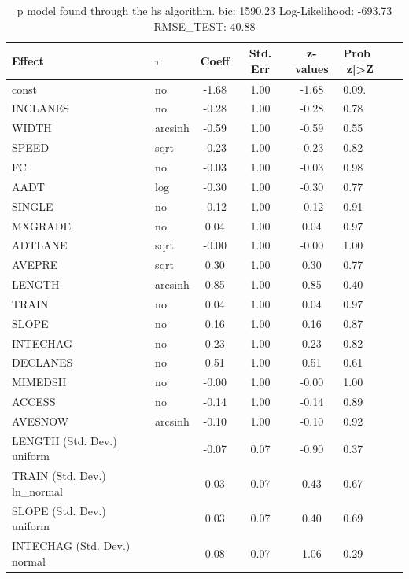 \begin{table}
	\caption{p model found through the hs algorithm. bic: 1590.23 Log-Likelihood: -693.73 RMSE_TEST: 40.88}
	\begin{center}
		\begin{tabular}{|l|l|c|c|c|l|}
			\hline
			Effect & $\tau$ & Coeff & Std. Err & z-values & Prob |z|>Z \\
			\hline
			const & no & -1.68 & 1.00 & -1.68 & 0.09. \\
			\hline
			INCLANES & no & -0.28 & 1.00 & -0.28 & 0.78 \\
			\hline
			WIDTH & arcsinh & -0.59 & 1.00 & -0.59 & 0.55 \\
			\hline
			SPEED & sqrt & -0.23 & 1.00 & -0.23 & 0.82 \\
			\hline
			FC & no & -0.03 & 1.00 & -0.03 & 0.98 \\
			\hline
			AADT & log & -0.30 & 1.00 & -0.30 & 0.77 \\
			\hline
			SINGLE & no & -0.12 & 1.00 & -0.12 & 0.91 \\
			\hline
			MXGRADE & no & 0.04 & 1.00 & 0.04 & 0.97 \\
			\hline
			ADTLANE & sqrt & -0.00 & 1.00 & -0.00 & 1.00 \\
			\hline
			AVEPRE & sqrt & 0.30 & 1.00 & 0.30 & 0.77 \\
			\hline
			LENGTH & arcsinh & 0.85 & 1.00 & 0.85 & 0.40 \\
			\hline
			TRAIN & no & 0.04 & 1.00 & 0.04 & 0.97 \\
			\hline
			SLOPE & no & 0.16 & 1.00 & 0.16 & 0.87 \\
			\hline
			INTECHAG & no & 0.23 & 1.00 & 0.23 & 0.82 \\
			\hline
			DECLANES & no & 0.51 & 1.00 & 0.51 & 0.61 \\
			\hline
			MIMEDSH & no & -0.00 & 1.00 & -0.00 & 1.00 \\
			\hline
			ACCESS & no & -0.14 & 1.00 & -0.14 & 0.89 \\
			\hline
			AVESNOW & arcsinh & -0.10 & 1.00 & -0.10 & 0.92 \\
			\hline
			LENGTH (Std. Dev.) uniform &  & -0.07 & 0.07 & -0.90 & 0.37 \\
			\hline
			TRAIN (Std. Dev.) ln_normal &  & 0.03 & 0.07 & 0.43 & 0.67 \\
			\hline
			SLOPE (Std. Dev.) uniform &  & 0.03 & 0.07 & 0.40 & 0.69 \\
			\hline
			INTECHAG (Std. Dev.) normal &  & 0.08 & 0.07 & 1.06 & 0.29 \\

\end{tabular}
\end{center}
\end{table}
